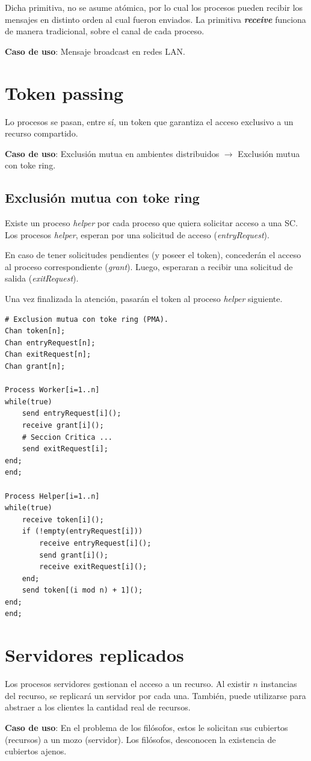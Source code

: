\documentclass[a4paper, 10pt]{report}
\begin{document}
Dicha primitiva, no se asume atómica, por lo cual los procesos pueden recibir los mensajes en distinto orden al cual fueron enviados. La primitiva \textbf{\emph{receive}} funciona de manera tradicional, sobre el canal de cada proceso.

\textbf{Caso de uso}: Mensaje broadcast en redes LAN.

\section{Token passing}

Lo procesos se pasan, entre sí, un token que garantiza el acceso exclusivo a un recurso compartido.

\textbf{Caso de uso}: Exclusión mutua en ambientes distribuidos $\rightarrow$ Exclusión mutua con toke ring.

\subsection{Exclusión mutua con toke ring}

Existe un proceso \emph{helper} por cada proceso que quiera solicitar acceso a una SC. Los procesos \emph{helper}, esperan por una solicitud de acceso (\emph{entryRequest}).

En caso de tener solicitudes pendientes (y poseer el token), concederán el acceso al proceso correspondiente (\emph{grant}). Luego, esperaran a recibir una solicitud de salida (\emph{exitRequest}).

Una vez finalizada la atención, pasarán el token al proceso \emph{helper} siguiente.

\begin{lstlisting}[multicols=2]
# Exclusion mutua con toke ring (PMA).
Chan token[n];
Chan entryRequest[n];
Chan exitRequest[n];
Chan grant[n];

Process Worker[i=1..n]
while(true)
    send entryRequest[i]();
    receive grant[i]();
    # Seccion Critica ...
    send exitRequest[i];
end;
end;

Process Helper[i=1..n]
while(true)
    receive token[i]();
    if (!empty(entryRequest[i]))
        receive entryRequest[i]();
        send grant[i]();
        receive exitRequest[i]();
    end;
    send token[(i mod n) + 1]();
end;
end;
\end{lstlisting}

\section{Servidores replicados}

Los procesos servidores gestionan el acceso a un recurso. Al existir $n$ instancias del recurso, se replicará un servidor por cada una. También, puede utilizarse para abstraer a los clientes la cantidad real de recursos.

\textbf{Caso de uso}: En el problema de los filósofos, estos le solicitan sus cubiertos (recursos) a un mozo (servidor). Los filósofos, desconocen la existencia de cubiertos ajenos.
\end{document}
